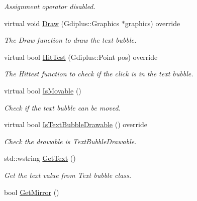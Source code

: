 \begin{DoxyCompactItemize}
\begin{DoxyCompactList}\small\item\em Assignment operator disabled. \end{DoxyCompactList}\item 
virtual void \hyperlink{class_c_text_bubble_drawable_ab06c08f5357aabd1275610baac806b59}{Draw} (Gdiplus\+::\+Graphics $\ast$graphics) override
\begin{DoxyCompactList}\small\item\em The Draw function to draw the text bubble. \end{DoxyCompactList}\item 
virtual bool \hyperlink{class_c_text_bubble_drawable_a85dd41fa9b6ce12989f529907030fd9a}{Hit\+Test} (Gdiplus\+::\+Point pos) override
\begin{DoxyCompactList}\small\item\em The Hittest function to check if the click is in the text bubble. \end{DoxyCompactList}\item 
\hypertarget{class_c_text_bubble_drawable_aa12d719c3c6e7d76edc3d0afdb5e9485}{virtual bool \hyperlink{class_c_text_bubble_drawable_aa12d719c3c6e7d76edc3d0afdb5e9485}{Is\+Movable} ()}\label{class_c_text_bubble_drawable_aa12d719c3c6e7d76edc3d0afdb5e9485}

\begin{DoxyCompactList}\small\item\em Check if the text bubble can be moved. \end{DoxyCompactList}\item 
virtual bool \hyperlink{class_c_text_bubble_drawable_a0ad09643af72c6fcd0182f38e8ce18da}{Is\+Text\+Bubble\+Drawable} () override
\begin{DoxyCompactList}\small\item\em Check the drawable is Text\+Bubble\+Drawable. \end{DoxyCompactList}\item 
\hypertarget{class_c_text_bubble_drawable_a61d871237611c8fc4f01f29bdee9dc58}{std\+::wstring \hyperlink{class_c_text_bubble_drawable_a61d871237611c8fc4f01f29bdee9dc58}{Get\+Text} ()}\label{class_c_text_bubble_drawable_a61d871237611c8fc4f01f29bdee9dc58}

\begin{DoxyCompactList}\small\item\em Get the text value from Text bubble class. \end{DoxyCompactList}\item 
\hypertarget{class_c_text_bubble_drawable_ae1b61142301c7ebb292917fb3988dd24}{bool \hyperlink{class_c_text_bubble_drawable_ae1b61142301c7ebb292917fb3988dd24}{Get\+Mirror} ()}\label{class_c_text_bubble_drawable_ae1b61142301c7ebb292917fb3988dd24}


\end{DoxyCompactItemize}
